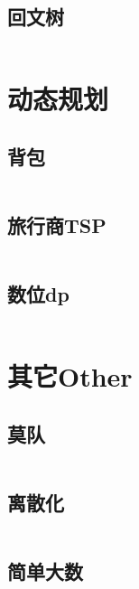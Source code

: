 \documentclass[twoside,sub3section,UTF8]{ctexart}						%
\begin{document}
	\subsection{回文树}
		\inputminted{c++}{"String/PAM.cpp"}
	
\section{动态规划}
	\subsection{背包}
		\inputminted{c++}{"Dynamic Programme/bag.cpp"}
	\subsection{旅行商TSP}
		\inputminted{c++}{"Dynamic Programme/TSP.cpp"}
	\subsection{数位dp}
		\inputminted{c++}{"Dynamic Programme/digit.cpp"}




\newpage
\section{其它Other}
	\subsection{莫队}
	\inputminted{c++}{"Other/Mos.cpp"}
	\subsection{离散化}
	\inputminted{c++}{"Other/discretization.cpp"}
	\subsection{简单大数}
	\inputminted{c++}{"IO/BigInt.cpp"}	
\end{document}
